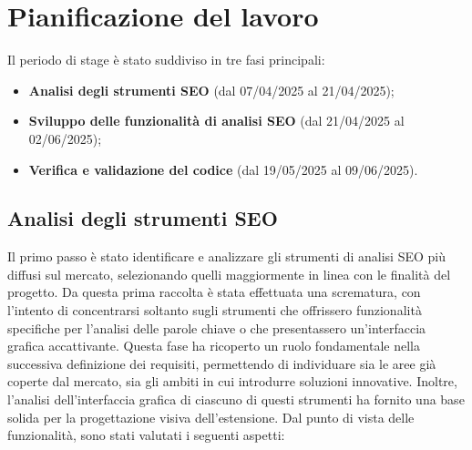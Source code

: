 \section{Pianificazione del lavoro}
\label{sec:pianificazione}

\par Il periodo di stage è stato suddiviso in tre fasi principali:
\begin{itemize}
  \item \textbf{Analisi degli strumenti SEO} (dal 07/04/2025 al 21/04/2025);
  \item \textbf{Sviluppo delle funzionalità di analisi SEO} (dal 21/04/2025 al 02/06/2025);
  \item \textbf{Verifica e validazione del codice} (dal 19/05/2025 al 09/06/2025).
\end{itemize}

\subsection{Analisi degli strumenti SEO}

\par Il primo passo è stato identificare e analizzare gli strumenti di analisi SEO più diffusi sul mercato, selezionando quelli maggiormente in linea con le finalità del progetto. Da questa prima raccolta è stata effettuata una scrematura, con l’intento di concentrarsi soltanto sugli strumenti che offrissero funzionalità specifiche per l’analisi delle parole chiave o che presentassero un’interfaccia grafica accattivante. Questa fase ha ricoperto un ruolo fondamentale nella successiva definizione dei requisiti, permettendo di individuare sia le aree già coperte dal mercato, sia gli ambiti in cui introdurre soluzioni innovative. Inoltre, l’analisi dell’interfaccia grafica di ciascuno di questi strumenti ha fornito una base solida per la progettazione visiva dell’estensione. Dal punto di vista delle funzionalità, sono stati valutati i seguenti aspetti:

